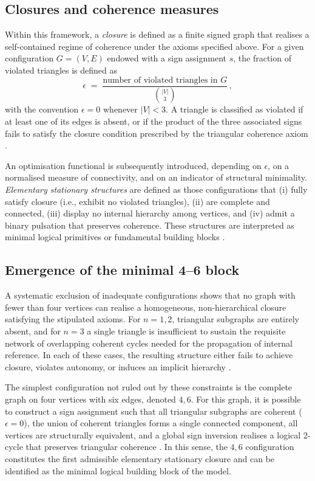 \documentclass{article}
\begin{document}
\subsection{Closures and coherence measures}
\label{subsec:closures}

Within this framework, a \emph{closure} is defined as a finite signed graph that realises a self-contained regime of coherence under the axioms specified above. For a given configuration \(G = (V, E)\) endowed with a sign assignment \(s\), the fraction of violated triangles is defined as
\[
  \epsilon \;=\; \frac{\text{number of violated triangles in } G}{\binom{|V|}{3}} \, ,
\]
with the convention \(\epsilon = 0\) whenever \(|V| < 3\). A triangle is classified as violated if at least one of its edges is absent, or if the product of the three associated signs fails to satisfy the closure condition prescribed by the triangular coherence axiom \citep{PDL_Main_2026}.

An optimisation functional is subsequently introduced, depending on \(\epsilon\), on a normalised measure of connectivity, and on an indicator of structural minimality. \emph{Elementary stationary structures} are defined as those configurations that (i) fully satisfy closure (i.e., exhibit no violated triangles), (ii) are complete and connected, (iii) display no internal hierarchy among vertices, and (iv) admit a binary pulsation that preserves coherence. These structures are interpreted as minimal logical primitives or fundamental building blocks \citep{PDL_Main_2026,PDL_position}.

\subsection{Emergence of the minimal 4--6 block}
\label{subsec:4_6_block}

A systematic exclusion of inadequate configurations shows that no graph with fewer than four vertices can realise a homogeneous, non-hierarchical closure satisfying the stipulated axioms. For \(n = 1,2\), triangular subgraphs are entirely absent, and for \(n = 3\) a single triangle is insufficient to sustain the requisite network of overlapping coherent cycles needed for the propagation of internal reference. In each of these cases, the resulting structure either fails to achieve closure, violates autonomy, or induces an implicit hierarchy \citep{PDL_Main_2026}.

The simplest configuration not ruled out by these constraints is the complete graph on four vertices with six edges, denoted \(4,6\). For this graph, it is possible to construct a sign assignment such that all triangular subgraphs are coherent (\(\epsilon = 0\)), the union of coherent triangles forms a single connected component, all vertices are structurally equivalent, and a global sign inversion realises a logical 2-cycle that preserves triangular coherence
\citep{PDL_Main_2026,PDL_intro}. In this sense, the \(4,6\) configuration constitutes the first admissible elementary stationary closure and can be identified as the minimal logical building block of the model.
\end{document}
